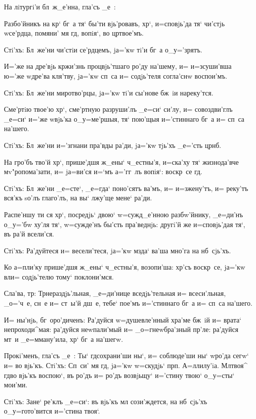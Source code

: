 На лiтургi'и бл~ж_е'нна, гла'съ _е~: 

Разбо'йникъ на кр` бг~а тя` бы'ти вjь'ровавъ, 
хр`, и=сповjь'да тя` чи'стjь w\т се'рдца, помяни' мя 
гд, вопiя`, во цр твое'мъ.

Стi'хъ: Бл~же'ни чи'стiи се'рдцемъ, jа='кw тi'и бг~а 
о_у='зрятъ. 

И='же на дре'вjь кр жи'знь процвjь'тшаго ро'ду 
на'шему, и= и=зсуши'вша ю='же w\т дре'ва кля'тву, jа='кw 
сп~са и= содjь'теля согла'снw воспои'мъ.

Стi'хъ: Бл~же'ни миротво'рцы, jа='кw тi'и сы'нове 
бж~iи нареку'тся. 

Сме'ртiю твое'ю хр`, сме'ртную разруши'лъ _е=си` 
си'лу, и= совоздви'глъ _е=си` и='же w\т вjь'ка 
о_у=ме'ршыя, тя` пою'щыя и='стиннаго бг~а и= сп~са 
на'шего. 

Стi'хъ: Бл~же'ни и='згнани пра'вды ра'ди, jа='кw 
тjь'хъ _е='сть цр нб.

На гро'бъ тво'й хр`, прише'дшя ж_ены` ч_естны'я, 
и=ска'ху тя` жизнода'вче мv"ропома'зати, и= jа=ви'ся 
и=`мъ а='гг~лъ вопiя`: воскр~се гд.

Стi'хъ: Бл~же'ни _е=сте`, _е=гда` поно'сятъ ва'мъ, и= 
и=зжену'тъ, и= реку'тъ вся'къ sо'лъ глаго'лъ, на вы` 
лжу'ще мене` ра'ди.

Распе'ншу ти ся хр`, посредjь` двою` w=сужд_е'нною 
разбw'йнику, _е=ди'нъ о_у='бw ху'ля тя`, w=сужде'нъ 
бы'сть пра'веднjь: другi'й же и=сповjь'дая тя`, въ ра'й 
всели'ся.

Стi'хъ: Ра'дуйтеся и= весели'теся, jа='кw мзда` ва'ша 
мно'га на нб~сjь'хъ.

Ко а=п ли'ку прише'дшя ж_ены` ч_естны'я, 
возопи'ша: хр'съ воскр~се, jа='кw вл и= 
содjь'телю тому` поклони'мся.

Сла'ва, тр: Тр нераздjь'льная, _е=ди'нице 
вседjь'тельная и= всеси'льная, _о='ч~е, сн~е и= ст~ы'й 
дш~е, тебе` пое'мъ и='стиннаго бг~а и= сп~са на'шего.

И= ны'нjь, бг~оро'диченъ: Ра'дуйся w=душевле'нный 
хра'ме бж~iй и= врата` непроходи^мая: ра'дуйся 
неwпали'мый и= _о=гнеwбра'зный пр'ле: ра'дуйся мт~и 
_е=мману'ила, хр` бг~а на'шегw.

Прокi'менъ, гла'съ _е~: Ты` гд сохрани'ши ны`, и= 
соблюде'ши ны` w\т ро'да сегw` и= во вjь'къ. Стi'хъ: 
Сп~си' мя гд, jа='кw w=скудjь` прп. А=ллилу'iа. 
Мл твоя^ гд во вjь'къ воспою`, въ ро'дъ и= ро'дъ 
возвjьщу` и='стину твою` о_у=сты` мои'ми.

Стi'хъ: Зане` ре'клъ _е=си`: въ вjь'къ мл 
сози'ждется, на нб~сjь'хъ о_у=гото'вится и='стина твоя`.

